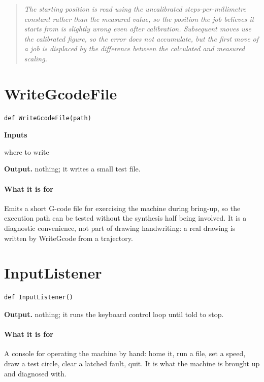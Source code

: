 \begin{quote}\small\itshape The starting position is read using the uncalibrated steps-per-millimetre constant rather than the measured value, so the position the job believes it starts from is slightly wrong even after calibration. Subsequent moves use the calibrated figure, so the error does not accumulate, but the first move of a job is displaced by the difference between the calculated and measured scaling.\end{quote}

\section{WriteGcodeFile}
\begin{lstlisting}[style=sig]
def WriteGcodeFile(path)
\end{lstlisting}

\noindent\textbf{Inputs}
\begin{description}[leftmargin=2.2em,style=nextline,font=\normalfont\ttfamily]\setlength\itemsep{1pt}
  \item[{path}] \normalfont where to write
\end{description}

\noindent\textbf{Output.} nothing; it writes a small test file.


\paragraph{What it is for}
Emits a short G-code file for exercising the machine during bring-up, so the execution path can be tested without the synthesis half being involved. It is a diagnostic convenience, not part of drawing handwriting: a real drawing is written by WriteGcode from a trajectory.


\section{InputListener}
\begin{lstlisting}[style=sig]
def InputListener()
\end{lstlisting}

\noindent\textbf{Output.} nothing; it runs the keyboard control loop until told to stop.


\paragraph{What it is for}
A console for operating the machine by hand: home it, run a file, set a speed, draw a test circle, clear a latched fault, quit. It is what the machine is brought up and diagnosed with.


